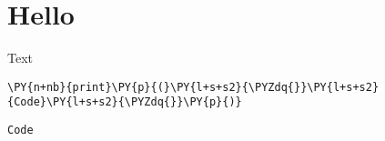 \section{Hello}


Text


\begin{Verbatim}[commandchars=\\\{\}]
\PY{n+nb}{print}\PY{p}{(}\PY{l+s+s2}{\PYZdq{}}\PY{l+s+s2}{Code}\PY{l+s+s2}{\PYZdq{}}\PY{p}{)}
\end{Verbatim}

\begin{Verbatim}
Code

\end{Verbatim}
